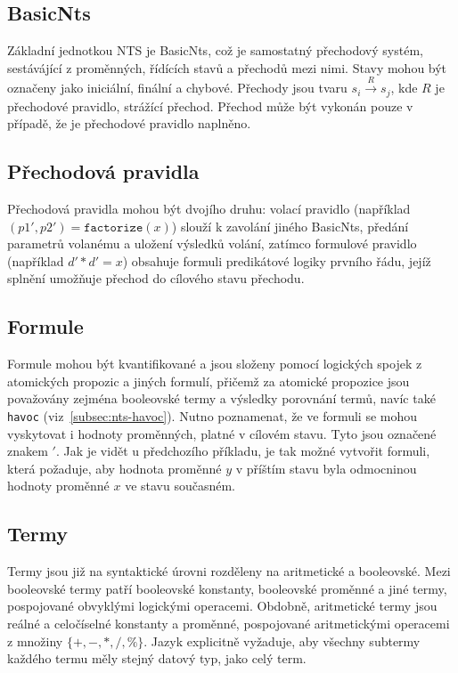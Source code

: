 \documentclass[10pt,a4paper,notitlepage]{report}
\begin{document}

\subsection{BasicNts}
Základní jednotkou NTS je BasicNts, což je samostatný přechodový systém, sestávájící z proměnných, řídících stavů a přechodů mezi nimi. Stavy mohou být označeny jako iniciální, finální a chybové. Přechody jsou tvaru $s_i \overset{R}{\rightarrow} s_j$, kde $R$ je přechodové pravidlo, strážící přechod. Přechod může být vykonán pouze v případě, že je přechodové pravidlo naplněno.

\subsection{Přechodová pravidla}
Přechodová pravidla mohou být dvojího druhu: volací pravidlo (například  $(p1',p2') = \texttt{factorize} (x)$) slouží k zavolání jiného BasicNts, předání parametrů volanému a uložení výsledků volání, zatímco formulové pravidlo (například $d' * d' = x$) obsahuje formuli predikátové logiky prvního řádu, jejíž splnění umožňuje přechod do cílového stavu přechodu. 

\subsection{Formule}
Formule mohou být kvantifikované a jsou složeny pomocí logických spojek z atomických propozic a jiných formulí, přičemž za atomické propozice jsou považovány zejména booleovské termy a výsledky porovnání termů, navíc také \texttt{havoc} (viz~\ref{subsec:nts-havoc}). Nutno poznamenat, že ve formuli se mohou vyskytovat i hodnoty proměnných, platné v cílovém stavu. Tyto jsou označené znakem $\prime$. Jak je vidět u předchozího příkladu, je tak možné vytvořit formuli, která požaduje, aby hodnota proměnné $y$ v příštím stavu byla odmocninou hodnoty proměnné $x$ ve stavu současném.

\subsection{Termy}
Termy jsou již na syntaktické úrovni rozděleny na aritmetické a booleovské. Mezi booleovské termy patří booleovské konstanty, booleovské proměnné a jiné termy, pospojované obvyklými logickými operacemi. Obdobně, aritmetické termy jsou reálné a celočíselné konstanty a proměnné, pospojované aritmetickými operacemi z množiny $\{+, -, *, /, \% \}$. Jazyk explicitně vyžaduje, aby všechny subtermy každého termu měly stejný datový typ, jako celý term.
\end{document}
